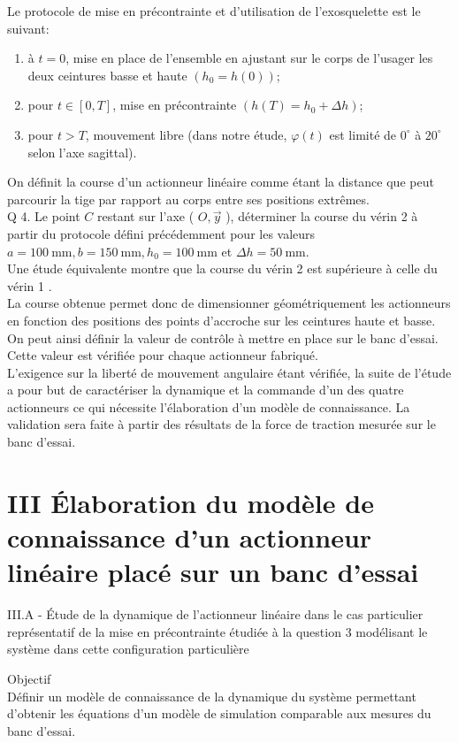 \documentclass[10pt]{article}
\begin{document}
Le protocole de mise en précontrainte et d'utilisation de l'exosquelette est le suivant:

\begin{enumerate}
  \item à $t=0$, mise en place de l'ensemble en ajustant sur le corps de l'usager les deux ceintures basse et haute $\left(h_{0}=h(0)\right)$;
  \item pour $t \in[0, T]$, mise en précontrainte $\left(h(T)=h_{0}+\Delta h\right)$;
  \item pour $t>T$, mouvement libre (dans notre étude, $\varphi(t)$ est limité de $0^{\circ}$ à $20^{\circ}$ selon l'axe sagittal).
\end{enumerate}

On définit la course d'un actionneur linéaire comme étant la distance que peut parcourir la tige par rapport au corps entre ses positions extrêmes.\\
Q 4. Le point $C$ restant sur l'axe ( $O, \vec{y}$ ), déterminer la course du vérin 2 à partir du protocole défini précédemment pour les valeurs $a=100 \mathrm{~mm}, b=150 \mathrm{~mm}, h_{0}=100 \mathrm{~mm}$ et $\Delta h=50 \mathrm{~mm}$.\\
Une étude équivalente montre que la course du vérin 2 est supérieure à celle du vérin 1 .\\
La course obtenue permet donc de dimensionner géométriquement les actionneurs en fonction des positions des points d'accroche sur les ceintures haute et basse. On peut ainsi définir la valeur de contrôle à mettre en place sur le banc d'essai. Cette valeur est vérifiée pour chaque actionneur fabriqué.\\
L'exigence sur la liberté de mouvement angulaire étant vérifiée, la suite de l'étude a pour but de caractériser la dynamique et la commande d'un des quatre actionneurs ce qui nécessite l'élaboration d'un modèle de connaissance. La validation sera faite à partir des résultats de la force de traction mesurée sur le banc d'essai.

\section{III Élaboration du modèle de connaissance d'un actionneur linéaire placé sur un banc d'essai}
III.A - Étude de la dynamique de l'actionneur linéaire dans le cas particulier représentatif de la mise en précontrainte étudiée à la question 3 modélisant le système dans cette configuration particulière

Objectif\\
Définir un modèle de connaissance de la dynamique du système permettant d'obtenir les équations d'un modèle de simulation comparable aux mesures du banc d'essai.
\end{document}
